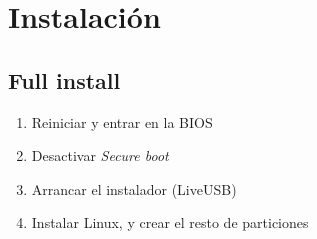 \documentclass[aspectratio=43]{beamer}
\begin{document}
    \begin{frame}{\subsecname}{}
        \begin{figure}
            \centering
            
        \end{figure}
    \end{frame}



    \section{Instalación}

    \subsection{Full install}
     \begin{frame}[fragile]{\subsecname}{}
        \begin{enumerate}
            \item Reiniciar y entrar en la BIOS
            \item Desactivar \textit{Secure boot}
            \item Arrancar el instalador (LiveUSB)
            \item Instalar Linux, y crear el resto de particiones
        \end{enumerate}
    \end{frame}
\end{document}
